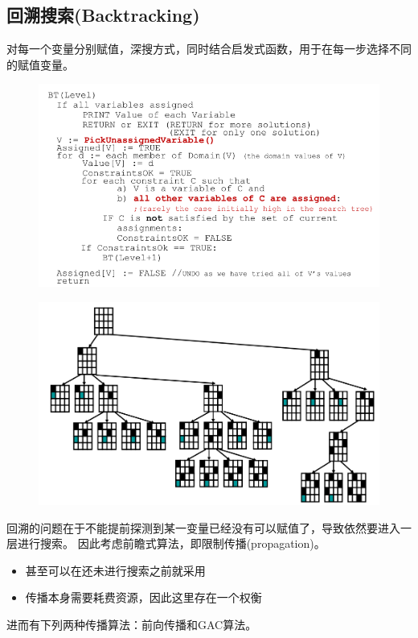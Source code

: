\subsection{回溯搜索(Backtracking)}
对每一个变量分别赋值，深搜方式，同时结合启发式函数，用于在每一步选择不同的赋值变量。
\begin{figure}[H]
\centering
\includegraphics[width=0.6\linewidth]{fig/backtracking.png}
\end{figure}
\begin{figure}[H]
\centering
\includegraphics[width=0.6\linewidth]{fig/backtracking_eg.png}
\end{figure}

回溯的问题在于不能提前探测到某一变量已经没有可以赋值了，导致依然要进入一层进行搜索。
因此考虑前瞻式算法，即限制传播(propagation)。
\begin{itemize}
	\item 甚至可以在还未进行搜索之前就采用
	\item 传播本身需要耗费资源，因此这里存在一个权衡
\end{itemize}
进而有下列两种传播算法：前向传播和GAC算法。

